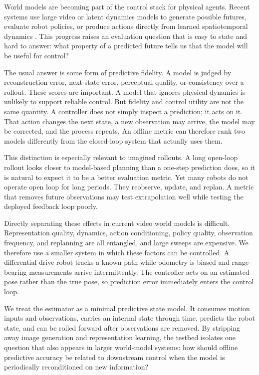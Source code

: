 \documentclass{article}
\begin{document}
World models are becoming part of the control stack for physical agents. Recent systems use large video or latent dynamics models to generate possible futures, evaluate robot policies, or produce actions directly from learned spatiotemporal dynamics \citep{agarwal2025cosmos,gemini2025veo,ye2026dreamzero,kim2026cosmospolicy}. This progress raises an evaluation question that is easy to state and hard to answer: what property of a predicted future tells us that the model will be useful for control?

The usual answer is some form of predictive fidelity. A model is judged by reconstruction error, next-state error, perceptual quality, or consistency over a rollout. These scores are important. A model that ignores physical dynamics is unlikely to support reliable control. But fidelity and control utility are not the same quantity. A controller does not simply inspect a prediction; it acts on it. That action changes the next state, a new observation may arrive, the model may be corrected, and the process repeats. An offline metric can therefore rank two models differently from the closed-loop system that actually uses them.

This distinction is especially relevant to imagined rollouts. A long open-loop rollout looks closer to model-based planning than a one-step prediction does, so it is natural to expect it to be a better evaluation metric. Yet many robots do not operate open loop for long periods. They reobserve, update, and replan. A metric that removes future observations may test extrapolation well while testing the deployed feedback loop poorly.

Directly separating these effects in current video world models is difficult. Representation quality, dynamics, action conditioning, policy quality, observation frequency, and replanning are all entangled, and large sweeps are expensive. We therefore use a smaller system in which these factors can be controlled. A differential-drive robot tracks a known path while odometry is biased and range-bearing measurements arrive intermittently. The controller acts on an estimated pose rather than the true pose, so prediction error immediately enters the control loop.

We treat the estimator as a minimal predictive state model. It consumes motion inputs and observations, carries an internal state through time, predicts the robot state, and can be rolled forward after observations are removed. By stripping away image generation and representation learning, the testbed isolates one question that also appears in larger world-model systems: how should offline predictive accuracy be related to downstream control when the model is periodically reconditioned on new information?
\end{document}
